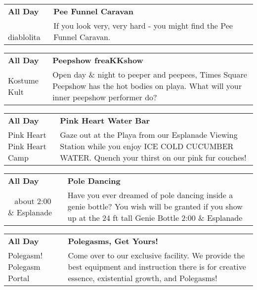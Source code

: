 \begin{tabular}{ p{1in} p{2.2in} }
    \textbf{All Day} & \textbf{Pee Funnel Caravan} \\
    ~ \newline diablolita & If you look very, very hard - you might find the Pee Funnel Caravan. \\
    \hline 
\end{tabular}
    
\begin{tabular}{ p{1in} p{2.2in} }
    \textbf{All Day} & \textbf{Peepshow freaKKshow} \\
    Kostume Kult \newline  & Open day \& night to peeper and peepees, Times Square Peepshow has the hot bodies on playa. What will your inner peepshow performer do? \\
    \hline 
\end{tabular}
    
\begin{tabular}{ p{1in} p{2.2in} }
    \textbf{All Day} & \textbf{Pink Heart Water Bar} \\
    Pink Heart \newline Pink Heart Camp & Gaze out at the Playa from our Esplanade Viewing Station while you enjoy ICE COLD CUCUMBER WATER. Quench your thirst on our pink fur couches! \\
    \hline 
\end{tabular}
    
\begin{tabular}{ p{1in} p{2.2in} }
    \textbf{All Day} & \textbf{Pole Dancing} \\
    ~ \newline about 2:00 \& Esplanade & Have you ever dreamed of pole dancing inside a genie bottle? You wish will be granted if you show up at the 24 ft tall Genie Bottle 2:00 \& Esplanade \\
    \hline 
\end{tabular}
    
\begin{tabular}{ p{1in} p{2.2in} }
    \textbf{All Day} & \textbf{Polegasms, Get Yours!} \\
    Polegasm! \newline Polegasm Portal & Come over to our exclusive facility. We provide the best equipment and instruction there is for creative essence, existential growth, and Polegasms! \\
    \hline 
\end{tabular}
    
